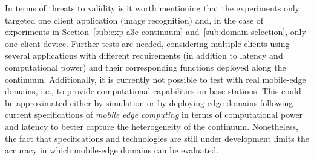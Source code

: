 In terms of threats to validity is it worth mentioning that the experiments only targeted one client application (image recognition) and, in the case of experiments in Section~\ref{sub:exp-a3e-continuum} and~\ref{sub:domain-selection}, only one client device. Further tests are needed, considering multiple clients using several applications with different requirements (in addition to latency and computational power) and their corresponding functions deployed along the continuum. Additionally, it is currently not possible to test with real mobile-edge domains, i.e., to provide computational capabilities on base stations. This could be approximated either by simulation or by deploying edge domains following current specifications of \textit{mobile edge computing} in terms of computational power and latency to better capture the heterogeneity of the continuum. Nonetheless, the fact that specifications and technologies are still under development limits the accuracy in which mobile-edge domains can be evaluated.  %



